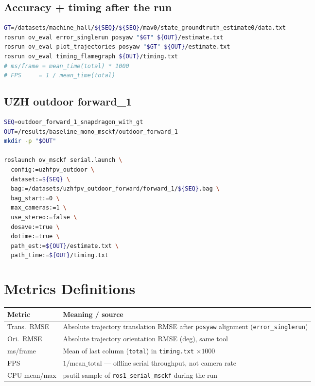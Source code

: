 \documentclass[11pt,a4paper]{article}
\begin{document}
\subsection{Accuracy + timing after the run}
\begin{lstlisting}[language=bash]
GT=/datasets/machine_hall/${SEQ}/${SEQ}/mav0/state_groundtruth_estimate0/data.txt
rosrun ov_eval error_singlerun posyaw "$GT" ${OUT}/estimate.txt
rosrun ov_eval plot_trajectories posyaw "$GT" ${OUT}/estimate.txt
rosrun ov_eval timing_flamegraph ${OUT}/timing.txt
# ms/frame = mean_time(total) * 1000
# FPS     = 1 / mean_time(total)
\end{lstlisting}

\subsection{UZH outdoor forward\_1}
\begin{lstlisting}[language=bash]
SEQ=outdoor_forward_1_snapdragon_with_gt
OUT=/results/baseline_mono_msckf/outdoor_forward_1
mkdir -p "$OUT"

roslaunch ov_msckf serial.launch \
  config:=uzhfpv_outdoor \
  dataset:=${SEQ} \
  bag:=/datasets/uzhfpv_outdoor_forward/forward_1/${SEQ}.bag \
  bag_start:=0 \
  max_cameras:=1 \
  use_stereo:=false \
  dosave:=true \
  dotime:=true \
  path_est:=${OUT}/estimate.txt \
  path_time:=${OUT}/timing.txt
\end{lstlisting}

\section{Metrics Definitions}

\begin{center}
\begin{tabular}{@{}p{3.2cm}p{11.5cm}@{}}
\toprule
\textbf{Metric} & \textbf{Meaning / source} \\
\midrule
Trans.\ RMSE & Absolute trajectory translation RMSE after \texttt{posyaw} alignment (\texttt{error\_singlerun}) \\
Ori.\ RMSE & Absolute trajectory orientation RMSE (deg), same tool \\
ms/frame & Mean of last column (\texttt{total}) in \texttt{timing.txt} \(\times 1000\) \\
FPS & \(1 / \mathrm{mean\_total}\) --- offline serial throughput, not camera rate \\
CPU mean/max & psutil sample of \texttt{ros1\_serial\_msckf} during the run \\
\bottomrule
\end{tabular}
\end{center}
\end{document}
